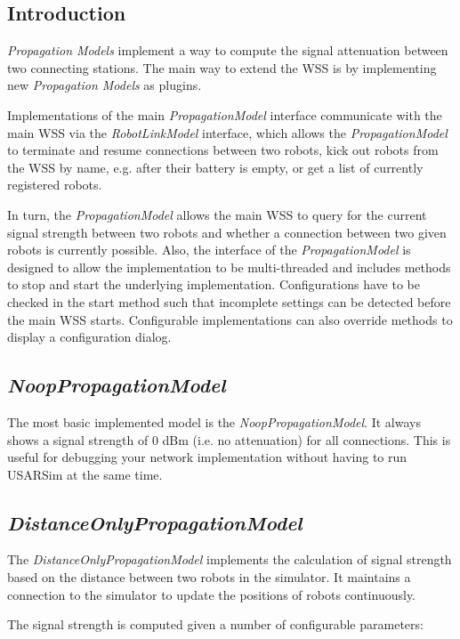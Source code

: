 \documentclass[11pt,a4paper]{article}
\begin{document}
\subsection{Introduction}

\emph{Propagation Models} implement a way to compute the signal attenuation between two connecting stations.
The main way to extend the WSS is by implementing new \emph{Propagation Models} as plugins.

Implementations of the main \emph{PropagationModel} interface communicate with the main WSS via the \emph{RobotLinkModel} interface, which allows the \emph{PropagationModel} to terminate and resume connections between two robots, kick out robots from the WSS by name, e.g. after their battery is empty, or get a list of currently registered robots.

In turn, the \emph{PropagationModel} allows the main WSS to query for the current signal strength between two robots and whether a connection between two given robots is currently possible. Also, the interface of the \emph{PropagationModel} is designed to allow the implementation to be multi-threaded and includes methods to stop and start the underlying implementation. Configurations have to be checked in the start method such that incomplete settings can be detected before the main WSS starts. Configurable implementations can also override methods to display a configuration dialog.

\subsection{\emph{NoopPropagationModel}}

The most basic implemented model is the \emph{NoopPropagationModel}. It always shows a signal strength of 0 dBm (i.e. no attenuation) for all connections. This is useful for debugging your network implementation without having to run USARSim at the same time.

\subsection{\emph{DistanceOnlyPropagationModel}}

The \emph{DistanceOnlyPropagationModel} implements the calculation of signal strength based on the distance between two robots in the simulator. It maintains a connection to the simulator to update the positions of robots continuously.

The signal strength is computed given a number of configurable parameters:
\end{document}
